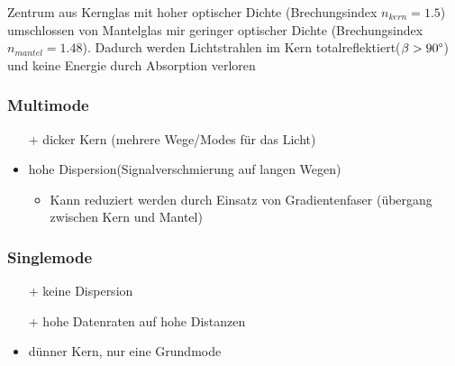 Zentrum aus Kernglas mit hoher optischer Dichte (Brechungsindex $n_{kern} = 1.5$)
umschlossen von Mantelglas mir geringer optischer Dichte (Brechungsindex $n_{mantel} = 1.48$).
Dadurch werden Lichtstrahlen im Kern totalreflektiert($\beta > 90 \degree$) und keine Energie durch Absorption
verloren

\subsubsection{Multimode}
\begin{itemize}
    \item[+] dicker Kern (mehrere Wege/Modes für das Licht)
    \item hohe Dispersion(Signalverschmierung auf langen Wegen)
    \begin{itemize}
        \item Kann reduziert werden durch Einsatz von Gradientenfaser (übergang zwischen
            Kern und Mantel)
    \end{itemize}
\end{itemize}

\subsubsection{Singlemode}
\begin{itemize}
    \item[+] keine Dispersion
    \item[+] hohe Datenraten auf hohe Distanzen
    \item dünner Kern, nur eine Grundmode
\end{itemize}



